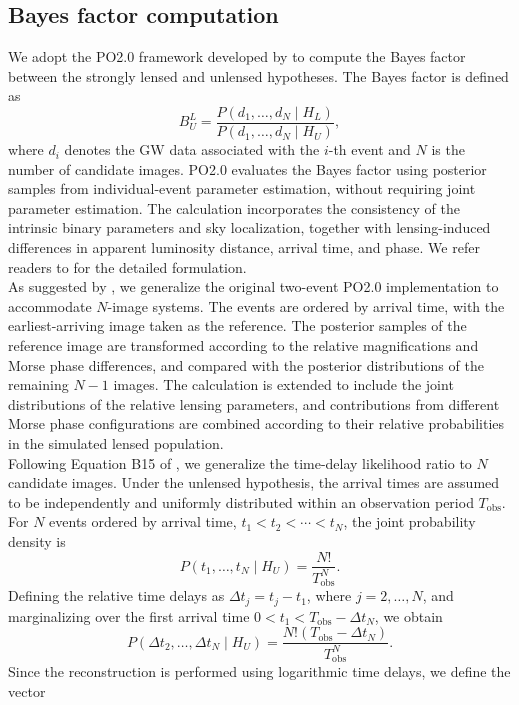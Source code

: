 \documentclass[linenumbers,amsmath,trackchanges]{aastex702}
\begin{document}
\subsection{Bayes factor computation}
We adopt the PO2.0 framework developed by \citet{Barsode2025} to compute the Bayes factor between 
the strongly lensed and unlensed hypotheses. The Bayes factor is defined as
\[
B_U^L = \frac{P(d_1,\ldots,d_N\mid H_L)}{P(d_1,\ldots,d_N\mid H_U)},
\]
where \(d_i\) denotes the GW data associated with the \(i\)-th event and \(N\) is the number of 
candidate images. PO2.0 evaluates the Bayes factor using posterior samples from individual-event 
parameter estimation, without requiring joint parameter estimation. The calculation incorporates 
the consistency of the intrinsic binary parameters and sky localization, together with lensing-induced 
differences in apparent luminosity distance, arrival time, and phase. We refer readers to 
\citet{Barsode2025} for the detailed formulation.\\
As suggested by \citet{Barsode2025}, we generalize the original two-event PO2.0 implementation to 
accommodate \(N\)-image systems. The events are ordered by arrival time, with the earliest-arriving 
image taken as the reference. The posterior samples of the reference image are transformed according to 
the relative magnifications and Morse phase differences, and compared with the posterior distributions 
of the remaining \(N-1\) images. The calculation is extended to include the joint distributions of 
the relative lensing parameters, and contributions from different Morse phase configurations are 
combined according to their relative probabilities in the simulated lensed population.\\
Following Equation B15 of \citet{Barsode2025}, we generalize the time-delay likelihood ratio to 
\(N\) candidate images. Under the unlensed hypothesis, the arrival times are assumed to be independently 
and uniformly distributed within an observation period \(T_{\mathrm{obs}}\). For \(N\) events ordered 
by arrival time, \(t_1<t_2<\cdots<t_N\), the joint probability density is
\[
P(t_1,\ldots,t_N\mid H_U)=\frac{N!}{T_{\mathrm{obs}}^N}.
\]
Defining the relative time delays as \(\Delta t_j=t_j-t_1\), where \(j=2,\ldots,N\), and marginalizing 
over the first arrival time \(0<t_1<T_{\mathrm{obs}}-\Delta t_N\), we obtain
\[
P(\Delta t_2,\ldots,\Delta t_N\mid H_U) = \frac{N!(T_{\mathrm{obs}}-\Delta t_N)}{T_{\mathrm{obs}}^N}.
\]
Since the reconstruction is performed using logarithmic time delays, we define the vector 
\end{document}
